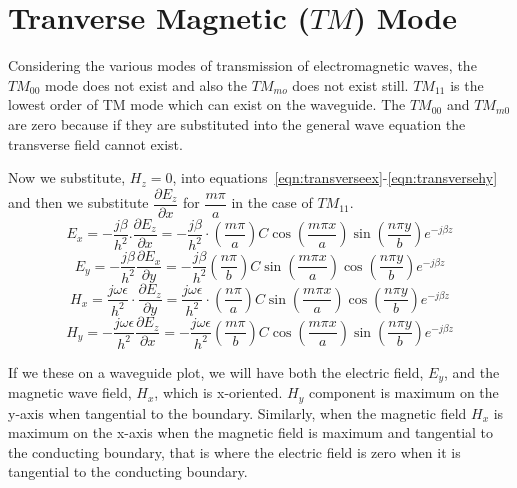 \section{Tranverse Magnetic ($TM$) Mode}
Considering the various modes of transmission of electromagnetic waves, the $TM_{00}$ mode does not exist and also the $TM_{mo}$ does not exist still. $TM_{11}$ is the lowest order of TM mode which can exist on the waveguide. The $TM_{00}$ and $TM_{m0}$ are zero because if they are substituted into the general wave equation the transverse field cannot exist. 

Now we substitute, $H_{z} = 0$, into equations~\ref{eqn:transverseex}-\ref{eqn:transversehy} and then we substitute $\dfrac{\partial E_{z}}{\partial{x}}$ for $\dfrac{m \pi}{a}$ in the case of $TM_{11}$. 
\begin{dmath*}
E_x = -\frac{j \beta}{h^2}.\frac{\partial E_{z}}{\partial{x}} = -\frac{j \beta}{h^{2}}\cdot\left(\frac{m\pi}{a}\right) C\cos \left(\frac{m\pi x}{a}\right)\sin \left(\frac{n\pi y}{b}\right)e^{-j \beta z}
\end{dmath*}
\begin{dmath*}
E_y = -\frac{j \beta}{h^2}\frac{\partial E_{x}}{\partial{y}} = -\frac{j \beta}{h^{2}}\left(\frac{n\pi}{b}\right) C \sin\left(\frac{m\pi x}{a}\right)\cos \left(\frac{n\pi y}{b}\right)e^{-j \beta z}
\end{dmath*}
\begin{dmath*}
H_x = \frac{j \omega\epsilon}{h^2}\cdot\frac{\partial E_{z}}{\partial{y}} = \frac{j \omega\epsilon}{h^{2}}\cdot\left(\frac{n\pi}{a}\right) C \sin \left(\frac{m\pi x}{a}\right)\cos \left(\frac{n\pi y}{b}\right)e^{-j \beta z}
\end{dmath*}
\begin{dmath*}
H_y =-\frac{j \omega\epsilon}{h^2}\frac{\partial E_{z}}{\partial{x}} = -\frac{j \omega\epsilon}{h^{2}}\left(\frac{m\pi}{b}\right) C \cos \left(\frac{m\pi x}{a}\right)\sin \left(\frac{n\pi y}{b}\right)e^{-j \beta z}
\end{dmath*}		      

If we these on a waveguide plot, we will have both the electric field, $E_{y}$, and the magnetic wave field, $H_{x}$, which is x-oriented. $H_{y}$ component is maximum on the y-axis when tangential to the boundary. Similarly, when the magnetic field $H_{x}$ is maximum on the x-axis when the magnetic field is maximum and tangential to the conducting boundary, that is where the electric field is zero when it is tangential to the conducting boundary.

